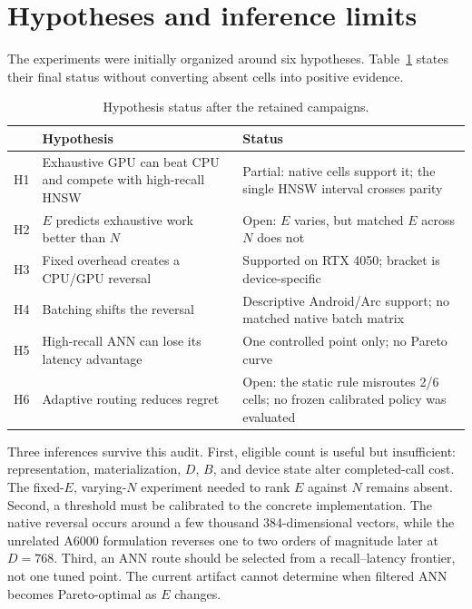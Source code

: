 \documentclass[10pt]{article}
\newcommand{\E}{E}
\newcommand{\D}{D}
\newcommand{\B}{B}
\begin{document}
\section{Hypotheses and inference limits}
The experiments were initially organized around six hypotheses. Table~\ref{tab:hypotheses} states their final status without converting absent cells into positive evidence.

\begin{table}[t]
\centering\small
\caption{Hypothesis status after the retained campaigns.}
\label{tab:hypotheses}
\begin{tabular}{p{.06\linewidth}p{.47\linewidth}p{.36\linewidth}}
\toprule
 & Hypothesis & Status \\
\midrule
H1 & Exhaustive GPU can beat CPU and compete with high-recall HNSW & Partial: native cells support it; the single HNSW interval crosses parity \\
H2 & \(\E\) predicts exhaustive work better than \(N\) & Open: \(\E\) varies, but matched \(\E\) across \(N\) does not \\
H3 & Fixed overhead creates a CPU/GPU reversal & Supported on RTX 4050; bracket is device-specific \\
H4 & Batching shifts the reversal & Descriptive Android/Arc support; no matched native batch matrix \\
H5 & High-recall ANN can lose its latency advantage & One controlled point only; no Pareto curve \\
H6 & Adaptive routing reduces regret & Open: the static rule misroutes 2/6 cells; no frozen calibrated policy was evaluated \\
\bottomrule
\end{tabular}
\end{table}

Three inferences survive this audit. First, eligible count is useful but insufficient: representation, materialization, \(\D\), \(\B\), and device state alter completed-call cost. The fixed-\(E\), varying-\(N\) experiment needed to rank \(E\) against \(N\) remains absent. Second, a threshold must be calibrated to the concrete implementation. The native reversal occurs around a few thousand 384-dimensional vectors, while the unrelated A6000 formulation reverses one to two orders of magnitude later at \(\D=768\). Third, an ANN route should be selected from a recall--latency frontier, not one tuned point. The current artifact cannot determine when filtered ANN becomes Pareto-optimal as \(E\) changes.
\end{document}
